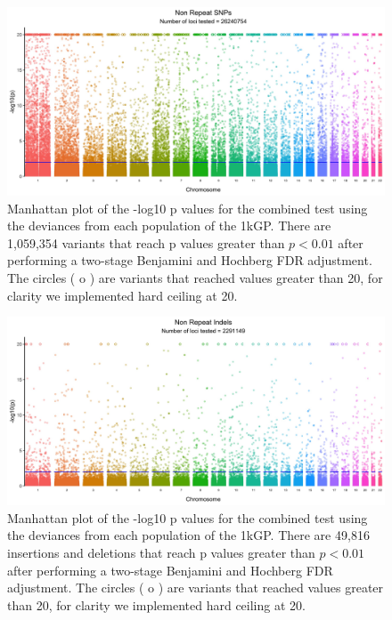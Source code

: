 \documentclass[9pt,lineno]{elife}
\begin{document}
\begin{figure}[h]
\includegraphics[width=\hsize,keepaspectratio]{./Figures/ManhattanPlot_Non_Repeat_SNPs.jpg}

\caption{Manhattan plot of the -log10 p values for the combined test using the deviances from each population of the 1kGP. 
There are 1,059,354 variants that reach p values greater than $ p < 0.01$ after performing a two-stage Benjamini and Hochberg FDR adjustment. 
The circles ( o ) are variants that reached values greater than 20, for clarity we implemented hard ceiling at 20.}
 \label{NRS_Manhattan}
\end{figure}

\begin{figure}[h]
\includegraphics[width=\hsize,keepaspectratio]{./Figures/ManhattanPlot_Non_Repeat_Indels.jpg}

\caption{Manhattan plot of the -log10 p values for the combined test using the deviances from each population of the 1kGP. 
There are 49,816 insertions and deletions that reach p values greater than $ p < 0.01$ after performing a two-stage Benjamini and Hochberg FDR adjustment. 
The circles ( o ) are variants that reached values greater than 20, for clarity we implemented hard ceiling at 20.}
 \label{NRI_Manhattan}
\end{figure}
\end{document}
